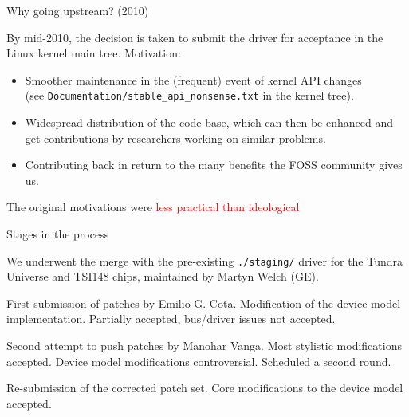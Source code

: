 \documentclass[compress,red]{beamer}
\begin{document}
\begin{frame}{Why going upstream? (2010)}

By mid-2010, the decision is taken to submit the driver for acceptance
in the Linux kernel main tree. Motivation:

\begin{itemize}
\item Smoother maintenance in the (frequent) event of kernel API
  changes\\
  (see \texttt{Documentation/stable\_api\_nonsense.txt} in the kernel
  tree).
\item Widespread distribution of the code base, which can then be
    enhanced and get contributions by researchers working on similar
    problems.
\item Contributing back in return to the many benefits the FOSS community
    gives us.
\end{itemize}
The original motivations were \textcolor{red}{less practical than ideological}
\end{frame}

\begin{frame}{Stages in the process}

We underwent the merge with the pre-existing \texttt{./staging/}
driver for the Tundra Universe and TSI148 chips,
maintained by Martyn Welch (GE).

\begin{description}
\pause
\item[nov 2010] First submission of patches by Emilio G. Cota.
    Modification of the device model implementation. Partially accepted,
    bus/driver issues not accepted.
\pause
\item[march 2011] Second attempt to push patches by Manohar Vanga.
    Most stylistic modifications accepted. Device model modifications
    controversial. Scheduled a second round.
\pause
\item[mid 2011] Re-submission of the corrected patch set. Core
    modifications to the device model accepted.
\end{description}
\end{frame}
\end{document}

